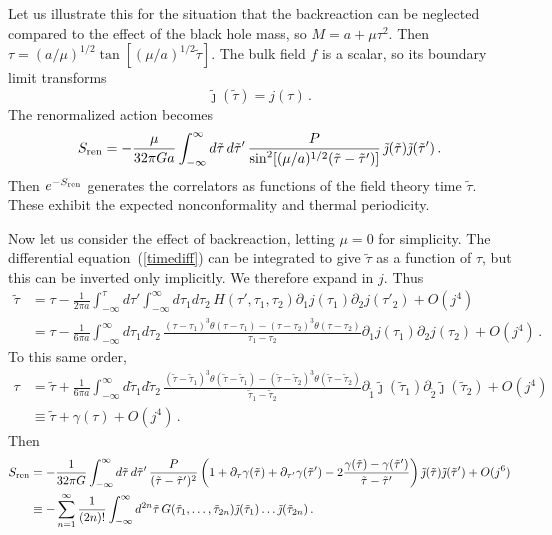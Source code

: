 \documentclass[12pt]{article}
\newcommand{\be}{\begin{equation}}
\newcommand{\ee}{\end{equation}}
\begin{document}
Let us illustrate this for the situation that the backreaction can be neglected compared to the effect of the black hole mass, so $M = a + \mu \tau^2$.  Then $\tau = (a/\mu)^{1/2} \tan[ (\mu/a)^{1/2}\tilde\tau]$.  The bulk field $f$ is a scalar, so its boundary limit transforms
\be
\tilde\jmath(\tilde\tau) = j(\tau) \,.
\ee
The renormalized action becomes 
\be
S_{\rm ren} = - {\mu \over 32 \pi G a} \int_{-\infty}^\infty  d\tilde\tau\, d\tilde\tau' \, \frac{ P}{\sin^2 [(\mu/a)^{1/2}(\tilde\tau - \tilde\tau')]} \, \tilde\jmath(\tilde\tau) \tilde\jmath(\tilde\tau')  \,. \label{bhgen}
\ee
Then $e^{-S_{\rm ren}}$ generates the correlators as functions of the field theory time $\tilde\tau$.
These exhibit the expected nonconformality and thermal periodicity.

Now let us consider the effect of backreaction, letting $\mu = 0$ for simplicity.  The differential equation~(\ref{timediff}) can be integrated to give $\tilde\tau$ as a function of $\tau$, but this can be inverted only implicitly.  We therefore expand in $j$.  Thus
\begin{align}
\tilde\tau &= \tau -  \frac{1}{2\pi a}\int_{-\infty}^\tau d\tau'   \int_{-\infty}^\infty d\tau_1 d\tau_2 \, H(\tau', \tau_1,\tau_2)
\partial_1 j(\tau_1) \partial_2 j(\tau'_2) + O(j^4) \nonumber\\
&= \tau -  \frac{1}{6\pi a}  \int_{-\infty}^\infty d\tau_1 d\tau_2 \, \frac{(\tau-\tau_1)^3  \theta( \tau-\tau_1) - (\tau-\tau_2)^3  \theta(\tau-\tau_2)   }{ \tau_1 - \tau_2}
\partial_1 j(\tau_1) \partial_2 j(\tau_2) + O(j^4) \,.
\end{align}
To this same order,
\begin{align}
\tau &= \tilde\tau +  \frac{1}{6\pi a}  \int_{-\infty}^\infty d\tilde\tau_1 d\tilde\tau_2 \, \frac{(\tilde\tau-\tilde\tau_1)^3  \theta( \tilde\tau-\tilde\tau_1) - (\tilde\tau-\tilde\tau_2)^3  \theta(\tilde\tau-\tilde\tau_2)   }{ \tilde\tau_1 - \tilde\tau_2}
\partial_{\tilde 1} \tilde\jmath(\tilde\tau_1) \partial_{\tilde 2} \tilde\jmath(\tilde\tau_2) + O(j^4) \nonumber\\
&\equiv \tilde\tau + \gamma(\tau) + O(j^4) \,.
\end{align}
Then
\begin{align}
S_{\rm ren} &= - {1 \over 32 \pi G} \int_{-\infty}^\infty  d\tilde\tau\, d\tilde\tau' \, \frac{ P}{(\tilde\tau - \tilde\tau')^2}
\left( 1 +  \partial_\tau \gamma(\tilde\tau) +  \partial_{\tau'}\gamma(\tilde\tau') - 2\frac{\gamma(\tilde\tau) -  \gamma(\tilde\tau')}{\tilde\tau-\tilde\tau'} \right) \tilde\jmath(\tilde\tau) \tilde\jmath(\tilde\tau') + O(j^6) \nonumber\\
&\equiv - \sum_{n=1}^\infty \frac{1}{(2n)!} \int_{-\infty}^\infty  d^{2n}\tilde\tau \, G(\tilde\tau_1,\ldots,\tilde\tau_{2n}) \tilde\jmath(\tilde\tau_1) \ldots
\tilde\jmath(\tilde\tau_{2n}) \,.
\end{align}
\end{document}
